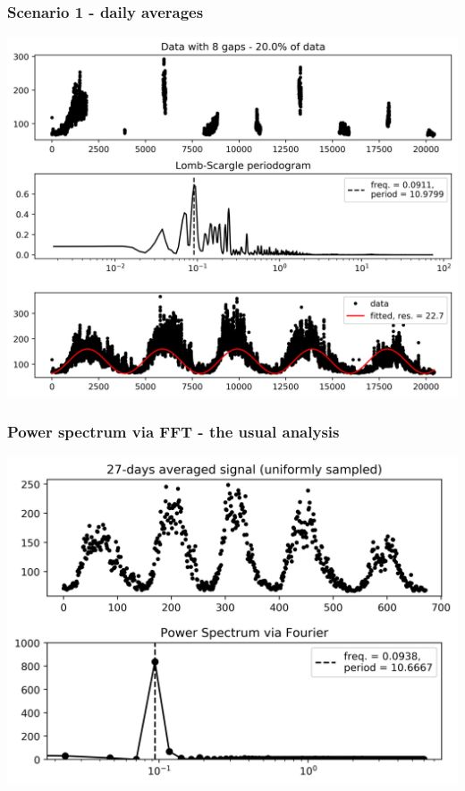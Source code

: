 \documentclass{beamer}
\begin{document}
\begin{frame}
\frametitle{Scenario 1 - daily averages}
\begin{center}
\includegraphics[scale=0.55]{../scripts/dataset1/periodograms_ny2.0_model2_Ng8.jpg}
\end{center}
\end{frame}

\begin{frame}
\frametitle{Power spectrum via FFT - the usual analysis}
\begin{center}
\includegraphics[scale=0.55]{Figuras/original_12.jpg}
\end{center}
\end{frame}
\end{document}
